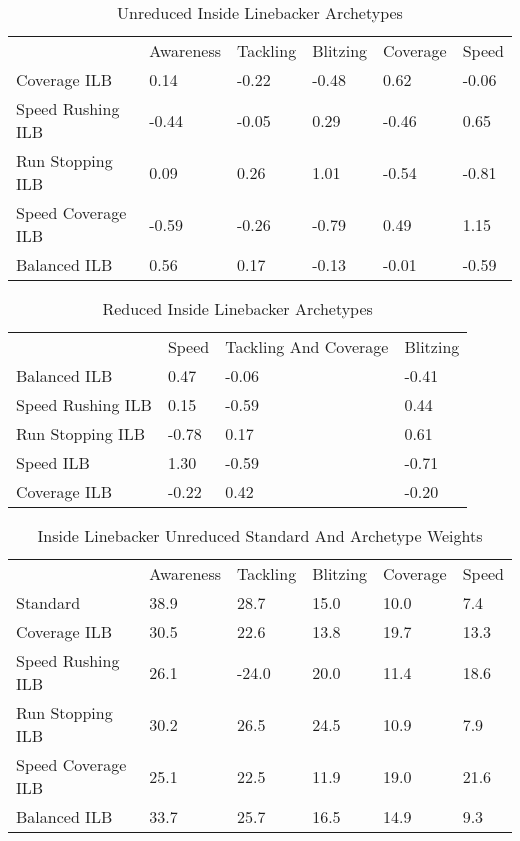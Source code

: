 \documentclass[11pt]{article}
\begin{document}
\begin{table}[]
\centering
\caption{Unreduced Inside Linebacker Archetypes}
\label{UnreducedInsideLinebacker}
\begin{tabular}{llllll}
                   & Awareness & Tackling & Blitzing & Coverage & Speed \\
Coverage ILB       & 0.14      & -0.22    & -0.48    & 0.62     & -0.06 \\
Speed Rushing ILB  & -0.44     & -0.05    & 0.29     & -0.46    & 0.65  \\
Run Stopping ILB   & 0.09      & 0.26     & 1.01     & -0.54    & -0.81 \\
Speed Coverage ILB & -0.59     & -0.26    & -0.79    & 0.49     & 1.15  \\
Balanced ILB       & 0.56      & 0.17     & -0.13    & -0.01    & -0.59
\end{tabular}
\end{table}

\begin{table}[]
\centering
\caption{Reduced Inside Linebacker Archetypes}
\label{ReducedInsideLinebacker}
\begin{tabular}{llll}
                  & Speed & Tackling And Coverage & Blitzing \\
Balanced ILB      & 0.47  & -0.06                 & -0.41    \\
Speed Rushing ILB & 0.15  & -0.59                 & 0.44     \\
Run Stopping ILB  & -0.78 & 0.17                  & 0.61     \\
Speed ILB         & 1.30  & -0.59                 & -0.71    \\
Coverage ILB      & -0.22 & 0.42                  & -0.20   
\end{tabular}
\end{table}

\begin{table}[]
\centering
\caption{Inside Linebacker Unreduced Standard And Archetype Weights}
\label{InsideLinebackerUnreducedWeights}
\begin{tabular}{llllll}
                   & Awareness & Tackling & Blitzing & Coverage & Speed \\
Standard           & 38.9      & 28.7     & 15.0     & 10.0     & 7.4   \\
Coverage ILB       & 30.5      & 22.6     & 13.8     & 19.7     & 13.3  \\
Speed Rushing ILB  & 26.1      & -24.0    & 20.0     & 11.4     & 18.6  \\
Run Stopping ILB   & 30.2      & 26.5     & 24.5     & 10.9     & 7.9   \\
Speed Coverage ILB & 25.1      & 22.5     & 11.9     & 19.0     & 21.6  \\
Balanced ILB       & 33.7      & 25.7     & 16.5     & 14.9     & 9.3  
\end{tabular}
\end{table}
\end{document}
